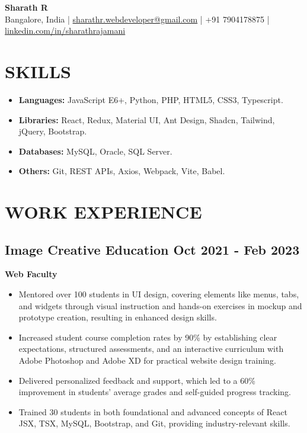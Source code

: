 \documentclass[a4paper,10pt]{article}
\newcommand{\dateright}[1]{\hfill \small \textbf{#1}}
\begin{document}
\begin{center}
    {\LARGE \textbf{Sharath R}} \\
    \vspace{0.2em}
    Bangalore, India |
    \small \href{mailto:sharath.rajamani@gmail.com}{{sharathr.webdeveloper@gmail.com}} |
    +91 7904178875 |
    \href{https://www.linkedin.com/in/sharathrajamani}{{linkedin.com/in/sharathrajamani}}\end{center}


\section*{SKILLS}
\begin{itemize}
    \item \textbf{Languages:} JavaScript E6+, Python, PHP, HTML5, CSS3, Typescript.
    \item \textbf{Libraries:} React, Redux, Material UI, Ant Design, Shadcn, Tailwind, jQuery, Bootstrap.
    \item \textbf{Databases:} MySQL, Oracle, SQL Server.
    \item \textbf{Others:} Git, REST APIs, Axios, Webpack, Vite, Babel.
\end{itemize}

\section*{WORK EXPERIENCE}
\subsection*{Image Creative Education \dateright{Oct 2021 - Feb 2023}}
\noindent \textbf{Web Faculty}
\begin{itemize}
\item Mentored over 100 students in UI design, covering elements like menus, tabs, and widgets through visual instruction and hands-on exercises in mockup and prototype creation, resulting in enhanced design skills.
\item Increased student course completion rates by 90\% by establishing clear expectations, structured assessments, and an interactive curriculum with Adobe Photoshop and Adobe XD for practical website design training.
\item Delivered personalized feedback and support, which led to a 60\% improvement in students' average grades and self-guided progress tracking.
\item Trained 30 students in both foundational and advanced concepts of React JSX, TSX, MySQL, Bootstrap, and Git, providing industry-relevant skills.
\end{itemize}
\end{document}
